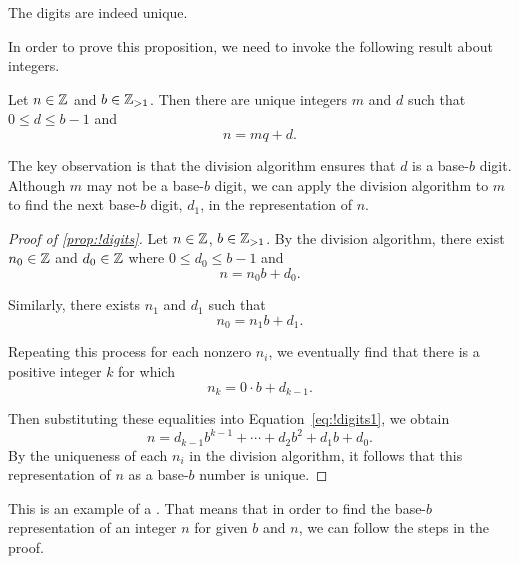 \begin{proposition}\label{prop:!digits} The digits are indeed unique.\end{proposition}

In order to prove this proposition, we need to invoke the following result about integers.

\begin{theorem} Let $n \in \mathbb{Z}$ and $b \in \mathbb{Z}_{> 1}$.  Then there are unique integers $m$ and $d$ such that $0 \leq d \leq b-1$ and \[n = m q + d.\]
\end{theorem}

The key observation is that the division algorithm ensures that $d$ is a base-$b$ digit.  Although $m$ may not be a base-$b$ digit, we can apply the division algorithm to $m$ to find the next base-$b$ digit, $d_1$, in the representation of $n$.

\begin{proof}[Proof of \ref{prop:!digits}] Let $n \in \mathbb{Z}$, $b \in \mathbb{Z}_{> 1}$.  By the division algorithm, there exist $n_0 \in \mathbb{Z}$ and $d_{0} \in \mathbb{Z}$ where $0 \leq d_0 \leq b-1$ and \begin{equation}\label{eq:!digits1}
n = n_0 b + d_0.
\end{equation}

Similarly, there exists $n_1$ and $d_1$ such that \begin{equation}
n_0 = n_1 b + d_1.
\end{equation}

Repeating this process for each nonzero $n_i$, we eventually find that there is a positive integer $k$ for which \begin{equation}
n_k = 0 \cdot b + d_{k-1}.
\end{equation}

Then substituting these equalities into Equation~\eqref{eq:!digits1}, we obtain \[
n = d_{k-1} b^{k-1} + \cdots + d_2 b^2 + d_1 b + d_0.
\]
By the uniqueness of each $n_i$ in the division algorithm, it follows that this representation of $n$ as a base-$b$ number is unique.
\end{proof}

This is an example of a .  That means that in order to find the base-$b$ representation of an integer $n$ for given $b$ and $n$, we can follow the steps in the proof.

